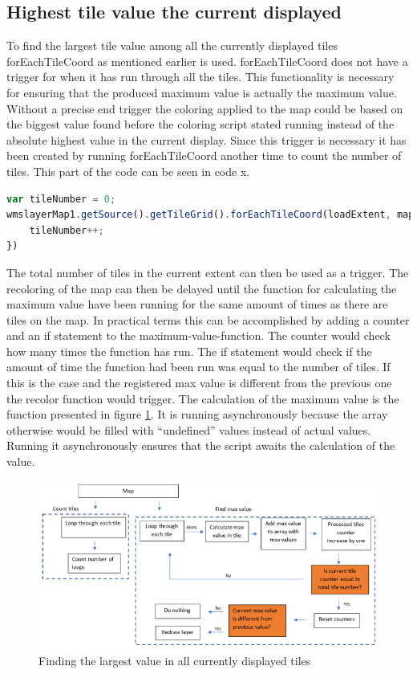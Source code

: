 \subsection{Highest tile value the current displayed}


To find the largest tile value among all the currently displayed tiles forEachTileCoord as mentioned earlier is used. forEachTileCoord does not have a trigger for when it has run through all the tiles. This functionality is necessary for ensuring that the produced maximum value is actually the maximum value. Without a precise end trigger the coloring applied to the map could be based on the biggest value found before the coloring script stated running instead of the absolute highest value in the current display.
Since this trigger is necessary it has been created by running forEachTileCoord another time to count the number of tiles. This part of the code can be seen in code x.
\begin{lstlisting}[language=JavaScript, caption={The JavaScript in the project}, label= VoresJS,escapechar=|] 
var tileNumber = 0;
wmslayerMap1.getSource().getTileGrid().forEachTileCoord(loadExtent, mapZoom - zoomlevelAdjustment, function(tileCoord) {
	tileNumber++;
})
\end{lstlisting}
The total number of tiles in the current extent can then be used as a trigger. 
The recoloring of the map can then be delayed until the function for calculating the maximum value have been running for the same amount of times as there are tiles on the map. In practical terms this can be accomplished by adding a counter and an if statement to the maximum-value-function. The counter would check how many times the function has run. The if statement would check if the amount of time the function had been run was equal to the number of tiles. If this is the case and the registered max value is different from the previous one the recolor function would trigger.
The calculation of the maximum value is the function presented in figure \ref{DoubleLoop}. It is running asynchronously because the array otherwise would be filled with “undefined” values instead of actual values. Running it asynchronously ensures that the script awaits the calculation of the value.  
\begin{figure} [H]
	\centering
	\includegraphics[width=.8\textwidth]{Pictures/DoubleLoop}
	\caption{Finding the largest value in all currently displayed tiles}
	\label{DoubleLoop}
\end{figure}

